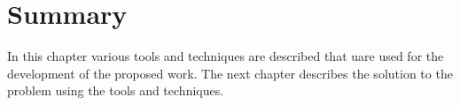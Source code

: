 \section{Summary}
In this chapter various tools and techniques are described that uare used for the development of the proposed work. The next chapter describes the solution to the problem using the tools and techniques.